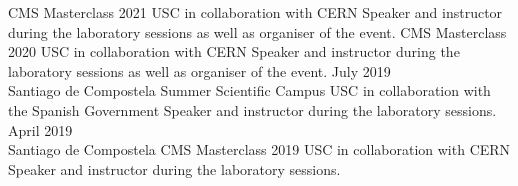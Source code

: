 \documentclass[9pt]{resumetemplate}
\begin{document}

\begin{entrylist}
    {CMS Masterclass 2021}
    {USC in collaboration with CERN}
    {%
    Speaker and instructor during the laboratory sessions as well as
    organiser of the event.
    }
    {CMS Masterclass 2020}
    {USC in collaboration with CERN}
    {%
    Speaker and instructor during the laboratory sessions as well as
    organiser of the event.
    }
  \entry
	  {July 2019\\\footnotesize{Santiago de Compostela}}
		{Summer Scientific Campus}
		{USC in collaboration with the Spanish Government}
		{Speaker and instructor during the laboratory sessions.}
  \entry
	  {April 2019\\\footnotesize{Santiago de Compostela}}
    {CMS Masterclass 2019}
    {USC in collaboration with CERN}
    {%
    Speaker and instructor during the laboratory sessions.
    }
\end{entrylist}

\end{document}
